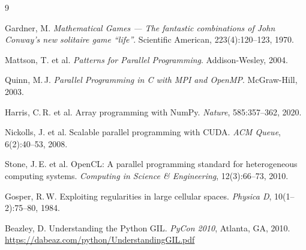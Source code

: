 \documentclass[12pt,a4paper]{article}
\begin{document}
\begin{thebibliography}{9}

Gardner, M.
\textit{Mathematical Games --- The fantastic combinations of John Conway's new solitaire game ``life''}.
Scientific American, 223(4):120--123, 1970.

Mattson, T. et al.
\textit{Patterns for Parallel Programming}.
Addison-Wesley, 2004.

Quinn, M.\,J.
\textit{Parallel Programming in C with MPI and OpenMP}.
McGraw-Hill, 2003.

Harris, C.\,R. et al.
Array programming with NumPy.
\textit{Nature}, 585:357--362, 2020.

Nickolls, J. et al.
Scalable parallel programming with CUDA.
\textit{ACM Queue}, 6(2):40--53, 2008.

Stone, J.\,E. et al.
OpenCL: A parallel programming standard for heterogeneous computing systems.
\textit{Computing in Science \& Engineering}, 12(3):66--73, 2010.

Gosper, R.\,W.
Exploiting regularities in large cellular spaces.
\textit{Physica D}, 10(1--2):75--80, 1984.

Beazley, D.
Understanding the Python GIL.
\textit{PyCon 2010}, Atlanta, GA, 2010.
\url{https://dabeaz.com/python/UnderstandingGIL.pdf}

\end{thebibliography}
\end{document}
